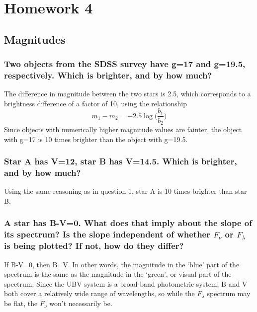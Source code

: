 \documentclass[12pt]{article}
\begin{document}
\section*{Homework 4}
\subsection*{Magnitudes}
\subsubsection{Two objects from the SDSS survey have g=17 and g=19.5,
respectively. Which is brighter, and by how much?}

The difference in magnitude between the two stars is 2.5, which corresponds
to a brightness difference of a factor of 10, using the relationship
\begin{equation*}
    m_1 - m_2 = -2.5 \log \Bigg(\frac{b_1}{b_2}\Bigg)
\end{equation*}
Since objects with numerically higher magnitude values are fainter,
the object with g=17 is 10 times brighter than the object with g=19.5.

\subsubsection{Star A has V=12, star B has V=14.5. Which is brighter,
and by how much?}

Using the same reasoning as in question 1,
star A is 10 times brighter than star B.

\subsubsection{A star has B-V=0. What does that imply about the slope of its
spectrum? Is the slope independent of whether $F_{\nu}$ or $F_{\lambda}$
is being plotted? If not, how do they differ?}

If B-V=0, then B=V. In other words, the magnitude in the `blue' part of
the spectrum is the same as the magnitude in the `green', or visual
part of the spectrum. Since the UBV system is a broad-band photometric
system, B and V both cover a relatively wide range of wavelengths, so
while the $F_{\lambda}$ spectrum may be flat, the $F_{\nu}$ won't
necessarily be.
\end{document}
